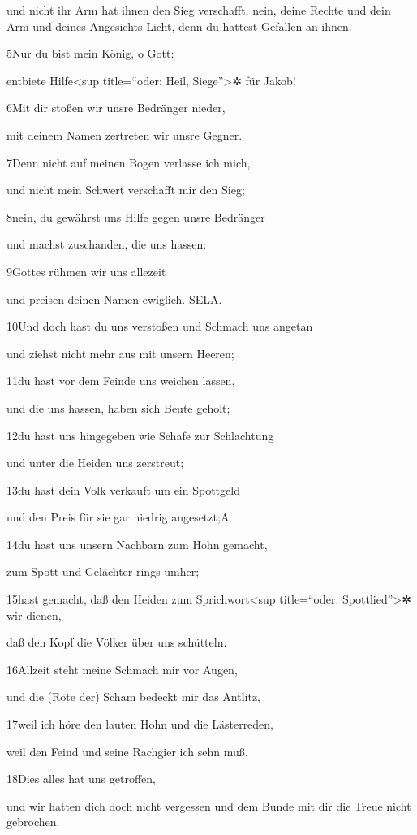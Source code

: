 und nicht ihr Arm hat ihnen den Sieg verschafft, nein, deine Rechte und
dein Arm und deines Angesichts Licht, denn du hattest Gefallen an ihnen.

5Nur du bist mein König, o Gott:

entbiete Hilfe\textless sup title=``oder: Heil, Siege''\textgreater✲ für
Jakob!

6Mit dir stoßen wir unsre Bedränger nieder,

mit deinem Namen zertreten wir unsre Gegner.

7Denn nicht auf meinen Bogen verlasse ich mich,

und nicht mein Schwert verschafft mir den Sieg;

8nein, du gewährst uns Hilfe gegen unsre Bedränger

und machst zuschanden, die uns hassen:

9Gottes rühmen wir uns allezeit

und preisen deinen Namen ewiglich. SELA.

10Und doch hast du uns verstoßen und Schmach uns angetan

und ziehst nicht mehr aus mit unsern Heeren;

11du hast vor dem Feinde uns weichen lassen,

und die uns hassen, haben sich Beute geholt;

12du hast uns hingegeben wie Schafe zur Schlachtung

und unter die Heiden uns zerstreut;

13du hast dein Volk verkauft um ein Spottgeld

und den Preis für sie gar niedrig angesetzt;{A}

14du hast uns unsern Nachbarn zum Hohn gemacht,

zum Spott und Gelächter rings umher;

15hast gemacht, daß den Heiden zum Sprichwort\textless sup title=``oder:
Spottlied''\textgreater✲ wir dienen,

daß den Kopf die Völker über uns schütteln.

16Allzeit steht meine Schmach mir vor Augen,

und die (Röte der) Scham bedeckt mir das Antlitz,

17weil ich höre den lauten Hohn und die Lästerreden,

weil den Feind und seine Rachgier ich sehn muß.

18Dies alles hat uns getroffen,

und wir hatten dich doch nicht vergessen und dem Bunde mit dir die Treue
nicht gebrochen.


